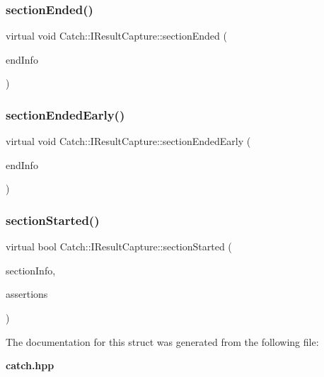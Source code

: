 \mbox{\label{struct_catch_1_1_i_result_capture_a4e152bc43dc0933684e31fa67a58195d}} 
\subsubsection{sectionEnded()}
{\footnotesize\ttfamily virtual void Catch\+::\+I\+Result\+Capture\+::section\+Ended (\begin{DoxyParamCaption}\item[{\textbf{ Section\+End\+Info} const \&}]{end\+Info }\end{DoxyParamCaption})\hspace{0.3cm}{\ttfamily [pure virtual]}}

\mbox{\label{struct_catch_1_1_i_result_capture_afcc71eef8ca821ae132cced4a2be6988}} 
\subsubsection{sectionEndedEarly()}
{\footnotesize\ttfamily virtual void Catch\+::\+I\+Result\+Capture\+::section\+Ended\+Early (\begin{DoxyParamCaption}\item[{\textbf{ Section\+End\+Info} const \&}]{end\+Info }\end{DoxyParamCaption})\hspace{0.3cm}{\ttfamily [pure virtual]}}

\mbox{\label{struct_catch_1_1_i_result_capture_a5b76ed52badcb64cf374202e12b81a03}} 
\subsubsection{sectionStarted()}
{\footnotesize\ttfamily virtual bool Catch\+::\+I\+Result\+Capture\+::section\+Started (\begin{DoxyParamCaption}\item[{\textbf{ Section\+Info} const \&}]{section\+Info,  }\item[{\textbf{ Counts} \&}]{assertions }\end{DoxyParamCaption})\hspace{0.3cm}{\ttfamily [pure virtual]}}



The documentation for this struct was generated from the following file\+:\begin{DoxyCompactItemize}
\item 
\textbf{ catch.\+hpp}\end{DoxyCompactItemize}
